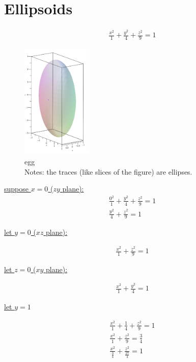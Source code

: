 \documentclass{article}
\begin{document}
\section{Ellipsoids}

\begin{align*}
  \frac{x^2}{1}+\frac{y^2}{4}+\frac{z^2}{9}=1
\end{align*}
\begin{figure}
  \includegraphics[width=0.3\textwidth]{ellipsoid1.png}
  \caption{egg\\Notes: the traces (like slices of the figure) are ellipses.}
  \label{fig:ellipsoid1}
\end{figure}
\underline{suppose $x=0$ ($zy$ plane):}
\begin{align*}
  \frac{0^2}{1}+\frac{y^2}{4}+\frac{z^2}{9}=1\\
  \frac{y^2}{4}+\frac{z^2}{9}=1
\end{align*}
\begin{flushleft}
  \underline{let $y=0$ ($xz$ plane):}
\end{flushleft}
\begin{align*}
  \frac{x^2}{1}+\frac{z^2}{9}=1
\end{align*}
\begin{flushleft}
  \underline{let $z=0$ ($xy$ plane):}
\end{flushleft}
\begin{align*}
  \frac{x^2}{1}+\frac{y^2}{4}=1
\end{align*}
\newpage
\begin{flushleft}
  \underline{let $y=1$}
\end{flushleft}
\begin{align*}
  \frac{x^2}{1}+\frac{1}{4}+\frac{z^2}{9}=1\\
  \frac{x^2}{1}+\frac{z^2}{9}=\frac{3}{4}\\
  \frac{x^2}{\frac{3}{4}}+\frac{z^2}{\frac{27}{4}}=1
\end{align*}
\end{document}
